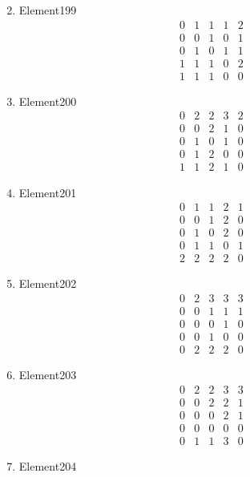 \documentclass[12pt]{article}
\begin{document}
\begin{multicols}{3}
\begin{enumerate}
\begin{equation*}
\end{equation*}
\item Element199
\begin{equation*}
\begin{array}{ccccc}
0&1&1&1&2\\
0&0&1&0&1\\
0&1&0&1&1\\
1&1&1&0&2\\
1&1&1&0&0
\end{array}
\end{equation*}
\item Element200
\begin{equation*}
\begin{array}{ccccc}
0&2&2&3&2\\
0&0&2&1&0\\
0&1&0&1&0\\
0&1&2&0&0\\
1&1&2&1&0
\end{array}
\end{equation*}
\item Element201
\begin{equation*}
\begin{array}{ccccc}
0&1&1&2&1\\
0&0&1&2&0\\
0&1&0&2&0\\
0&1&1&0&1\\
2&2&2&2&0
\end{array}
\end{equation*}
\item Element202
\begin{equation*}
\begin{array}{ccccc}
0&2&3&3&3\\
0&0&1&1&1\\
0&0&0&1&0\\
0&0&1&0&0\\
0&2&2&2&0
\end{array}
\end{equation*}
\item Element203
\begin{equation*}
\begin{array}{ccccc}
0&2&2&3&3\\
0&0&2&2&1\\
0&0&0&2&1\\
0&0&0&0&0\\
0&1&1&3&0
\end{array}
\end{equation*}
\item Element204

\end{enumerate}
\end{multicols}
\end{document}
